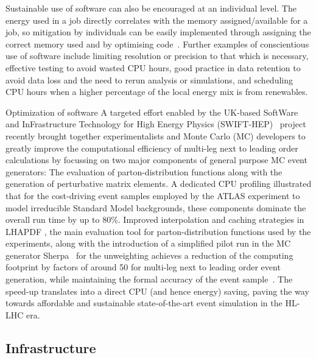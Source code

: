 \documentclass[../SustainableHEP.tex]{subfiles}
\begin{document}
Sustainable use of software can also be encouraged at an individual level. The energy used in a job directly correlates with the memory assigned/available for a job, so mitigation by individuals can be easily implemented through assigning the correct memory used and by optimising code~\cite{Karayakin}. Further examples of conscientious use of software include limiting resolution or precision to that which is necessary, effective testing to avoid wasted CPU hours, good practice in data retention to avoid data loss and the need to rerun analysis or simulations, and scheduling CPU hours when a higher percentage of the local energy mix is from renewables.

\begin{bestpractice}{Optimization of software}%
A targeted effort enabled by the UK-based SoftWare and InFrastructure Technology for High Energy Physics (SWIFT-HEP)~\cite{SWIFTHEP} project recently brought together experimentalists and Monte Carlo (MC) developers to greatly improve the computational efficiency of multi-leg next to leading order calculations by focussing on two major components of general purpose MC event generators: The evaluation of parton-distribution functions along with the generation of perturbative matrix elements. A dedicated CPU profiling illustrated that for the cost-driving event samples employed by the ATLAS experiment to model irreducible Standard Model backgrounds, these components dominate the overall run time by up to 80\%. Improved interpolation and caching strategies in LHAPDF \cite{Buckley:2014ana}, the main evaluation tool for parton-distribution functions used by the experiments, along with the introduction of a simplified pilot run in the MC generator Sherpa~\cite{Sherpa} for the unweighting achieves a reduction of the computing footprint by factors of around 50 for multi-leg next to leading order event generation, while maintaining the formal accuracy of the event sample~\cite{Bothmann:2022thx}. The speed-up translates into a direct CPU (and hence energy) saving, paving the way towards affordable and sustainable state-of-the-art event simulation in the HL-LHC era.

\end{bestpractice}


\subsection{Infrastructure}\label{subsec:infrastructure}
\end{document}
